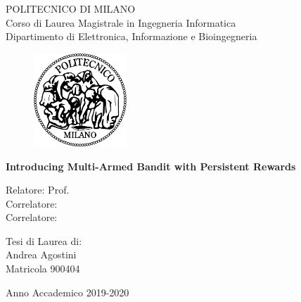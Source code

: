 \thispagestyle{empty}
\vspace*{-1.5cm} \bfseries{
\begin{center}
  \large
  POLITECNICO DI MILANO\\
  \normalsize
  Corso di Laurea Magistrale in Ingegneria 
  Informatica\\
  Dipartimento di Elettronica, Informazione e Bioingegneria\\
  \begin{figure}[htbp]
    \begin{center}
      \includegraphics[width=3.5cm]{./images/logopm}
    \end{center}
  \end{figure}
  \vspace*{0.3cm} \LARGE



  \textbf{Introducing Multi-Armed Bandit with Persistent Rewards}


  \vspace*{.75truecm} \large

\end{center}
\vspace*{3.0cm} \large
\begin{flushleft}


  Relatore: Prof.  \\
  Correlatore: \\
  Correlatore: \\

\end{flushleft}
\vspace*{1.0cm}
\begin{flushright}


  Tesi di Laurea di:\\ Andrea Agostini\\ Matricola 900404 \\


\end{flushright}
\vspace*{0.5cm}
\begin{center}



  Anno Accademico 2019-2020
\end{center} \clearpage
}

